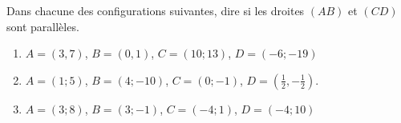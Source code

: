 
\begin{exercice}\label{exosmath-0083}

    Dans chacune des configurations suivantes, dire si les droites \( (AB)\) et \( (CD)\) sont parallèles.
    \begin{enumerate}
        \item
            \( A=(3,7)\), \( B=(0,1)\), \( C=(10;13)\), \( D=(-6;-19)\)
        \item
            \( A=(1;5)\), \( B=(4;-10)\), \( C=(0;-1)\), \( D=(\frac{ 1 }{2},-\frac{ 1 }{2})\).
        \item
            \( A=(3;8)\), \( B=(3;-1)\), \( C=(-4;1)\), \( D=(-4;10)\)
    \end{enumerate}

\end{exercice}
